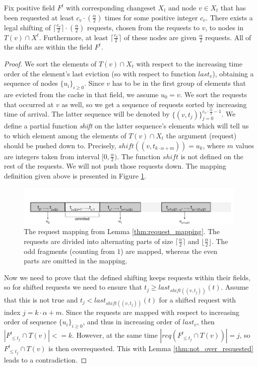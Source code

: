 \begin{lemma} Fix positive field $F^t$ with corresponding changeset $X_t$ and node $v \in X_t$
that has been requested at least $c_v \cdot (\frac{\alpha}{2})$ times for some
positive integer $c_v$. There exists a legal shifting of $\lceil \frac{c_v}{2}
\rceil \cdot (\frac{\alpha}{2})$ requests, chosen from the requests to $v$, to nodes in $T(v) \cap X^t$.
Furthermore, at least $\lceil \frac{c_v}{2} \rceil$ of
these nodes are given $\frac{\alpha}{2}$ requests. All of the shifts are within
the field $F^t$.  \label{thm:request_mapping}
\end{lemma} 
\begin{proof} We sort
the elements of $T(v) \cap X_t$ with respect to the increasing time order of the
element's last eviction (so with respect to function $last_v$), obtaining a sequence of nodes
$\{u_i\}_{i \geq 0}$. Since $v$ has to be in the first group of elements that are
evicted from the cache in that field, we assume $u_0 = v$. We sort the
requests that occurred at $v$ as well, so we get a sequence of requests sorted by
increasing time of arrival. The latter sequence will be denoted by $\{(v,
t_j)\}_{j=0}^{c_v \cdot \frac{\alpha}{2} - 1}$. We define a partial function
\textit{shift} on the latter sequence's elements which will tell us to which element
among the elements of $T(v) \cap X_t$ the argument (request) should be pushed
down to. Precisely, $shift((v, t_{k \cdot \alpha + m})) = u_k$, where $m$ values are
integers taken from interval $[0, \frac{\alpha}{2})$. The function $shift$ is not
defined on the rest of the requests. We will not push those requests down. The
mapping definition given above is presented in Figure \ref{fig:req_map}.
\begin{figure} \begin{center}
\includegraphics[width=1.1\textwidth]{request_mapping.png} \end{center}
\caption{The request mapping from Lemma \ref{thm:request_mapping}. The requests are
divided into alternating parts of size $\lceil \frac{\alpha}{2} \rceil$ and
$\lfloor \frac{\alpha}{2} \rfloor$. The odd fragments (counting from $1$) are
mapped, whereas the even parts are omitted in the mapping.} \label{fig:req_map}
\end{figure}

Now we need to prove that the defined shifting keeps requests within their fields,
so for shifted requests we need to ensure that $t_j \geq last_{shift((v, t_j))}(t)$. Assume that
this is not true and $t_j < last_{shift((v, t_j))}(t)$ for a shifted request with index
$j = k \cdot \alpha + m$. Since the requests are mapped with respect to
increasing order of sequence $\{u_i\}_{i \geq 0}$, and thus in increasing order of $last_v$, then $|F^t_{\leq t_j} \cap T(v)| <= k$. However, at the
same time $|req(F^t_{\leq t_j} \cap T(v))| = j$, so $F^t_{\leq t_j} \cap T(v)$ is
then overrequested. This with Lemma \ref{thm:not_over_requested} leads to a
contradiction.
\end{proof}
